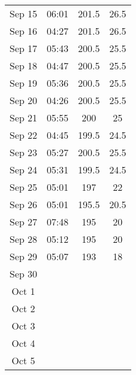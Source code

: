 \documentclass{article}
\begin{document}
\begin{longtable}{|c|c|c|c|}
Sep 15 & 06:01 & 201.5 & 26.5 \\
Sep 16 & 04:27 & 201.5 & 26.5 \\
Sep 17 & 05:43 & 200.5 & 25.5 \\
Sep 18 & 04:47 & 200.5 & 25.5 \\
Sep 19 & 05:36 & 200.5 & 25.5 \\
Sep 20 & 04:26 & 200.5 & 25.5 \\
Sep 21 & 05:55 & 200 & 25 \\
Sep 22 & 04:45 & 199.5 & 24.5 \\
Sep 23 & 05:27 & 200.5 & 25.5 \\
Sep 24 & 05:31 & 199.5 & 24.5 \\
Sep 25 & 05:01 & 197 & 22 \\
Sep 26 & 05:01 & 195.5 & 20.5 \\
Sep 27 & 07:48 & 195 & 20 \\
Sep 28 & 05:12 & 195 & 20 \\
Sep 29 & 05:07 & 193 & 18 \\
Sep 30 & & & \\
\hline
Oct 1 & & & \\
Oct 2 & & & \\
Oct 3 & & & \\
Oct 4 & & & \\
Oct 5 & & & \\
\end{longtable}
\end{document}
